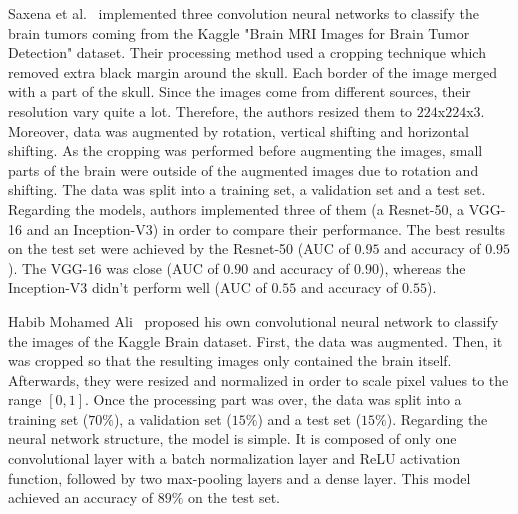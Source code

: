 Saxena et al.~\cite{31} implemented three convolution neural networks to classify the brain tumors coming from the Kaggle "Brain MRI Images for Brain Tumor Detection" dataset. Their processing method used a cropping technique which removed extra black margin around the skull. Each border of the image merged with a part of the skull. Since the images come from different sources, their resolution vary quite a lot. Therefore, the authors resized them to $224$x$224$x$3$. Moreover, data was augmented by rotation, vertical shifting and horizontal shifting. As the cropping was performed before augmenting the images, small parts of the brain were outside of the augmented images due to rotation and shifting. The data was split into a training set, a validation set and a test set. Regarding the models, authors implemented three of them (a Resnet-50, a VGG-16 and an Inception-V3) in order to compare their performance. The best results on the test set were achieved by the Resnet-50 (AUC of $0.95$ and accuracy of $0.95$). The VGG-16 was close (AUC of $0.90$ and accuracy of $0.90$), whereas the Inception-V3 didn't perform well (AUC of $0.55$ and accuracy of $0.55$).

Habib Mohamed Ali~\cite{04} proposed his own convolutional neural network to classify the images of the Kaggle Brain dataset. First, the data was augmented. Then, it was cropped so that the resulting images only contained the brain itself. Afterwards, they were resized and normalized in order to scale pixel values to the range $[0,1]$. Once the processing part was over, the data was split into a training set ($70\%$), a validation set ($15\%$) and a test set ($15\%$). Regarding the neural network structure, the model is simple. It is composed of only one convolutional layer with a batch normalization layer and ReLU activation function, followed by two max-pooling layers and a dense layer. This model achieved an accuracy of $89\%$ on the test set.



